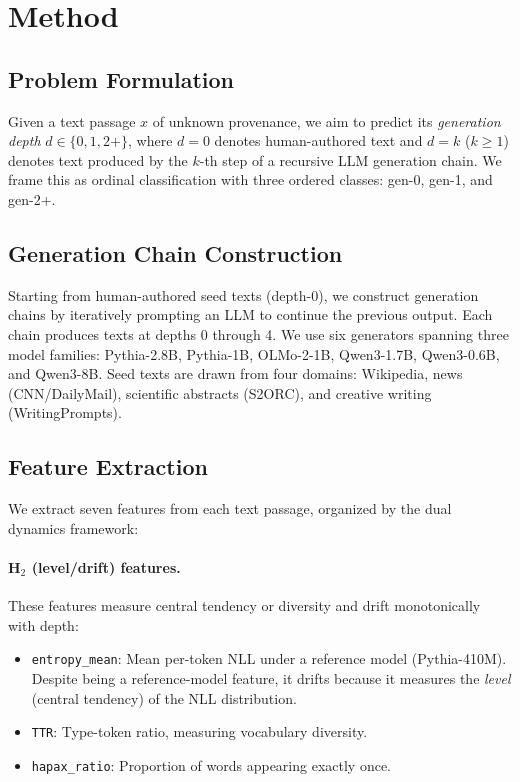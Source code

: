 \documentclass[letterpaper]{article}
\begin{document}
\section{Method}
\label{sec:method}

\subsection{Problem Formulation}
Given a text passage $x$ of unknown provenance, we aim to predict its \emph{generation depth} $d \in \{0, 1, 2+\}$, where $d{=}0$ denotes human-authored text and $d{=}k$ ($k{\geq}1$) denotes text produced by the $k$-th step of a recursive LLM generation chain.
We frame this as ordinal classification with three ordered classes: gen-0, gen-1, and gen-2+.

\subsection{Generation Chain Construction}
\label{sec:chains}
Starting from human-authored seed texts (depth-0), we construct generation chains by iteratively prompting an LLM to continue the previous output.
Each chain produces texts at depths 0 through 4.
We use six generators spanning three model families: Pythia-2.8B, Pythia-1B, OLMo-2-1B, Qwen3-1.7B, Qwen3-0.6B, and Qwen3-8B.
Seed texts are drawn from four domains: Wikipedia, news (CNN/DailyMail), scientific abstracts (S2ORC), and creative writing (WritingPrompts).

\subsection{Feature Extraction}
\label{sec:features}
We extract seven features from each text passage, organized by the dual dynamics framework:

\paragraph{H$_2$ (level/drift) features.}
These features measure central tendency or diversity and drift monotonically with depth:
\begin{itemize}
\item \texttt{entropy\_mean}: Mean per-token NLL under a reference model (Pythia-410M). Despite being a reference-model feature, it drifts because it measures the \emph{level} (central tendency) of the NLL distribution.
\item \texttt{TTR}: Type-token ratio, measuring vocabulary diversity.
\item \texttt{hapax\_ratio}: Proportion of words appearing exactly once.
\end{itemize}
\end{document}
